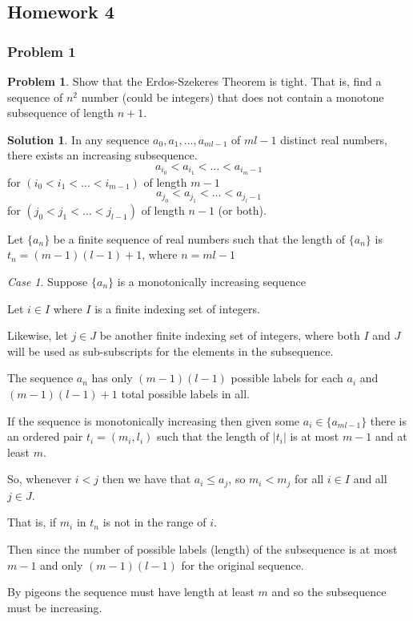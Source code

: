 \documentclass[10pt,a4paper,titlepage,twoside,draft]{article}
\theoremstyle{plain}
\theoremstyle{definition}
\newtheorem*{prob}{Problem}
\newtheorem*{sol}{Solution}
\theoremstyle{remark}
\newtheorem{case}{Case}
\begin{document}
    
\pagebreak
    

\subsection{Homework 4}

\subsubsection{Problem 1}

\begin{prob}
Show that the Erdos-Szekeres Theorem is tight. That is, find a sequence of $n^2$ number (could be integers) that does not contain a monotone subsequence of length $n+1$.
\end{prob}  

\medskip

\begin{sol}   
In any sequence $a_{0},a_{1},\ldots ,a_{ml-1}$ of $ml-1$ distinct real numbers, there exists an increasing subsequence.
\[a_{i_0} < a_{i_1} < \ldots < a_{i_m-1} \]
  for $(i_{0} < i_{1} < \ldots < i_{m-1})$ of length $m-1$
\[a_{j_0} < a_{j_1} < \ldots < a_{j_l-1}\]
  for $(j_{0} < j_{1} < \ldots < j_{l-1})$ of length $n-1$ (or both).
  
Let $\{a_n\}$ be a finite sequence of real numbers such that the length of $\{a_n\}$ is $t_{n} = (m-1)(l-1)+1$, where $n = ml-1$
\end{sol}

\medskip
   
\begin{case}
Suppose $\{a_{n}\}$ is a monotonically increasing sequence
   
Let $i \in I$ where $I$ is a finite indexing set of integers.
   
Likewise, let $j \in J$ be another finite indexing set of integers, where both $I$ and $J$ will be used as sub-subscripts for the elements in the subsequence. 
   
The sequence $a_{n}$ has only $(m-1)(l-1)$ possible labels for each $a_{i}$ and $(m-1)(l-1)+1$ total possible labels in all.
   
If the sequence is monotonically increasing then given some $a_{i} \in \{a_{ml-1}\}$ there is an ordered pair $t_{i} = (m_{i}, l_{i})$ such that the length of $|t_{i}|$ is at most $m-1$ and at least $m$.
    
So, whenever $i < j$ then we have that $a_{i} \leq a_{j}$, so $m_{i} < m_{j}$ for all $i \in I$ and all $j \in J$.
   
That is, if $m_{i}$ in $t_{n}$ is not in the range of $i$.
   
Then since the number of possible labels (length) of the subsequence is at most $m-1$ and only $(m-1)(l-1)$ for the original sequence. 
   
By pigeons the sequence must have length at least $m$ and so the subsequence must be increasing. 
\end{case}  
 
\end{document}
